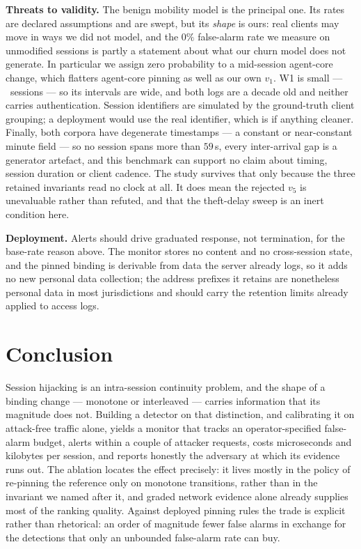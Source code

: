 \documentclass[conference]{IEEEtran}
\begin{document}
\noindent\textbf{Threats to validity.}  The benign mobility model is the
principal one.  Its rates are declared assumptions and are swept, but its
\emph{shape} is ours: real clients may move in ways we did not model, and the
$0\%$ false-alarm rate we measure on unmodified sessions is partly a statement
about what our churn model does not generate.  In particular we assign zero
probability to a mid-session agent-core change, which flatters agent-core
pinning as well as our own $v_1$.  W1 is small --- \corpusSessWeb\ sessions ---
so its intervals are wide, and both logs are a decade old and neither carries
authentication.  Session identifiers are simulated by the ground-truth client
grouping; a deployment would use the real identifier, which is if anything
cleaner.  Finally, both corpora have degenerate timestamps --- a constant or near-constant
minute field --- so no session spans more than $59$\,s, every inter-arrival gap
is a generator artefact, and this benchmark can support no claim about timing,
session duration or client cadence.  The study survives that only because the
three retained invariants read no clock at all.  It does mean the rejected $v_5$
is unevaluable rather than refuted, and that the theft-delay sweep is an inert
condition here.

\noindent\textbf{Deployment.}  Alerts should drive graduated response, not
termination, for the base-rate reason above.  The monitor stores no content and
no cross-session state, and the pinned binding is derivable from data the server
already logs, so it adds no new personal data collection; the address prefixes
it retains are nonetheless personal data in most jurisdictions and should carry
the retention limits already applied to access logs.

\section{Conclusion}

Session hijacking is an intra-session continuity problem, and the shape of a
binding change --- monotone or interleaved --- carries information that its
magnitude does not.  Building a detector on that distinction, and calibrating it
on attack-free traffic alone, yields a monitor that tracks an operator-specified
false-alarm budget, alerts within a couple of attacker requests, costs
microseconds and kilobytes per session, and reports honestly the adversary at
which its evidence runs out.  The ablation locates the effect precisely: it lives
mostly in the policy of re-pinning the reference only on monotone transitions,
rather than in the invariant we named after it, and graded network evidence
alone already supplies most of the ranking quality.  Against deployed pinning rules the trade is
explicit rather than rhetorical: an order of magnitude fewer false alarms in
exchange for the detections that only an unbounded false-alarm rate can buy.

\balance


\end{document}
